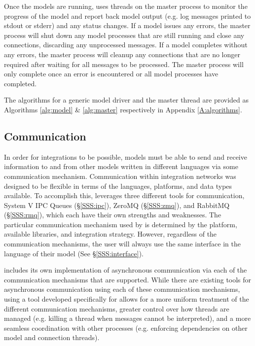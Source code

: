 \documentclass[journal]{IEEEtran}
\newcommand{\todo}[1]{{\color{red}{#1}}}
\newcommand{\pkg}{{\tt \todo{cis\_interface}}{}}
\newcommand{\A}{Appendix{ }}
\begin{document}
Once the models are running, {\pkg} uses threads on the master process to monitor the progress of the model and report back model output (e.g. log messages printed to stdout or stderr) and any status changes. If a model issues any errors, the master process will shut down any model processes that are still running and close any connections, discarding any unprocessed messages. If a model completes without any errors, the master process will cleanup any connections that are no longer required after waiting for all messages to be processed. The master process will only complete once an error is encountered or all model processes have completed.

The algorithms for a generic model driver and the master thread are provided as Algorithms \ref{alg:model} \& \ref{alg:master} respectively in \A\ref{A:algorithms}.

\subsection{Communication}\label{SS:communication}
%
In order for integrations to be possible, models must be able to send and receive information to and from other models written in different languages via some communication mechanism. Communication within {\pkg} integration networks was designed to be flexible in terms of the languages, platforms, and data types available. To accomplish this, {\pkg} leverages three different tools for communication, System V IPC Queues (\S\ref{SSS:ipc}), ZeroMQ (\S\ref{SSS:zmq}), and RabbitMQ (\S\ref{SSS:rmq}), which each have their own strengths and weaknesses. The particular communication mechanism used by {\pkg} is determined by the platform, available libraries, and integration strategy. However, regardless of the communication mechanisms, the user will always use the same interface in the language of their model (See \S\ref{SSS:interface}).

{\pkg} includes its own implementation of asynchronous communication via each of the communication mechanisms that are supported. While there are existing tools for asynchronous communication using each of these communication mechanisms, using a tool developed specifically for {\pkg} allows for a more uniform treatment of the different communication mechanisms, greater control over how threads are managed (e.g. killing a thread when messages cannot be interpreted), and a more seamless coordination with other {\pkg} processes (e.g. enforcing dependencies on other model and connection threads).
\end{document}
